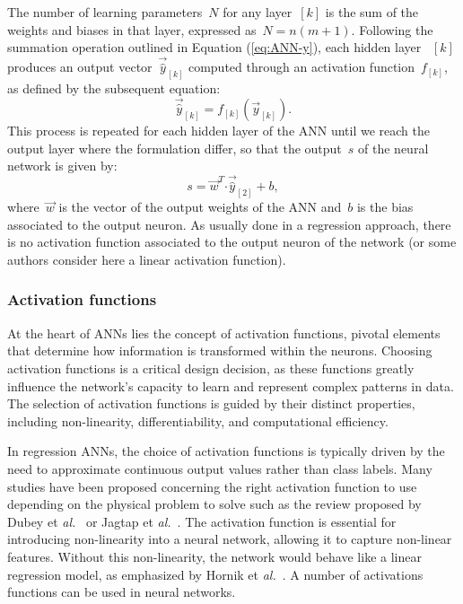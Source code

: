 \documentclass[algorithms,article,submit,pdftex,oneauthors]{Definitions/mdpi}
\makeatletter
\DeclareRobustCommand{\dotp}{\boldsymbol{\cdot}}
\DeclareRobustCommand{\lay}[1]{_{[#1]}}
\DeclareRobustCommand{\Lay}[1]{\mbox{$[#1]$}}
\DeclareRobustCommand{\eal}{et \emph{al.}\@\xspace}
\makeatother
\begin{document}
\textcolor{greencolor}{The number of learning parameters~$N$ for any layer~\Lay{k} is the sum of the weights and biases in that layer, expressed as~$N=n(m+1)$.
Following the summation operation outlined in Equation (\ref{eq:ANN-y}), each hidden layer ~\Lay{k} produces an output vector~$\overrightarrow{\hat{y}}\lay{k}$ computed through an activation function~$f\lay{k}$, as defined by the subsequent equation:}
\begin{equation}
\overrightarrow{\hat{y}}\lay{k}=f\lay{k}(\overrightarrow{y}\lay{k}).
\label{eq:ANN-f}
\end{equation}
\textcolor{greencolor}{This process is repeated for each hidden layer of the ANN until we reach the output layer where the formulation differ, so that the output~$s$ of the neural network is given by:}
\begin{equation}
s = \overrightarrow{w}^T \dotp \overrightarrow{\hat{y}}\lay{2} + b\label{eq:ANN-s},
\end{equation}
where~$\overrightarrow{w}$ is the vector of the output weights of the ANN and~$b$ is the bias associated to the output neuron.
As usually done in a regression approach, there is no activation function associated to the output neuron of the network (or some authors consider here a linear activation function).

\subsubsection{Activation functions}\label{subsubsec:ANN-act}

\textcolor{greencolor}{At the heart of ANNs lies the concept of activation functions, pivotal elements that determine how information is transformed within the neurons.
Choosing activation functions is a critical design decision, as these functions greatly influence the network's capacity to learn and represent complex patterns in data.}
The selection of activation functions is guided by their distinct properties, including non-linearity, differentiability, and computational efficiency.

In regression ANNs, the choice of activation functions is typically driven by the need to approximate continuous output values rather than class labels.
Many studies have been proposed concerning the right activation function to use depending on the physical problem to solve such as the review proposed by Dubey \eal~\cite{Dubey-2022-AFD} or Jagtap \eal~\cite{Jagtap-2023-HIA}.
\textcolor{greencolor}{The activation function is essential for introducing non-linearity into a neural network, allowing it to capture non-linear features.
Without this non-linearity, the network would behave like a linear regression model, as emphasized by Hornik \eal~\cite{Hornik-1989-MFN}.}
A number of activations functions can be used in neural networks.
\end{document}
